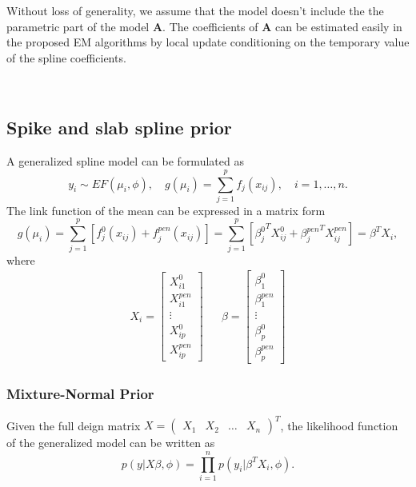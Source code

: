 \documentclass[AMA,STIX1COL,]{WileyNJD-v2}
\begin{document}
Without loss of generality, we assume that the model doesn't include the
the parametric part of the model \(\boldsymbol{A}\). The coefficients of
\(\boldsymbol{A}\) can be estimated easily in the proposed EM algorithms
by local update conditioning on the temporary value of the spline
coefficients.

~

\hypertarget{spike-and-slab-spline-prior}{%
\subsection{Spike and slab spline
prior}\label{spike-and-slab-spline-prior}}

A generalized spline model can be formulated as \[
y_i \sim EF(\mu_i, \phi), \quad g(\mu_i) = \sum\limits_{j=1}^p f_j(x_{ij}), \quad i = 1, \dots, n.
\] The link function of the mean can be expressed in a matrix form \[
g(\mu_i) = \sum\limits_{j=1}^p\left[f_j^0(x_{ij}) + f_j^{pen}(x_{ij})\right] = \sum\limits_{j=1}^p\left[{\beta_j^0}^T X_{ij}^0 + {\beta_j^{pen}}^T X_{ij}^{pen}\right]
 = \beta^T X_i,
\] where \[
\begin{aligned}
  X_i = \begin{bmatrix}X^0_{i1}\\X^{pen}_{i1}\\\vdots \\X^0_{ip}\\X^{pen}_{ip}\end{bmatrix}
& &
  \beta = \begin{bmatrix}\beta^0_1\\\beta^{pen}_{1}\\\vdots \\\beta^0_{p}\\\beta^{pen}_{p}\end{bmatrix}
\end{aligned}
\]

\hfill\break

\hypertarget{mixture-normal-prior}{%
\subsubsection{Mixture-Normal Prior}\label{mixture-normal-prior}}

Given the full deign matrix
\(X = \begin{pmatrix} X_1 & X_2 & \dots & X_n \end{pmatrix}^T\), the
likelihood function of the generalized model can be written as \[
p(y|X\beta, \phi) = \prod\limits^n_{i=1}p(y_i|\beta^T X_i, \phi).
\]
\end{document}
